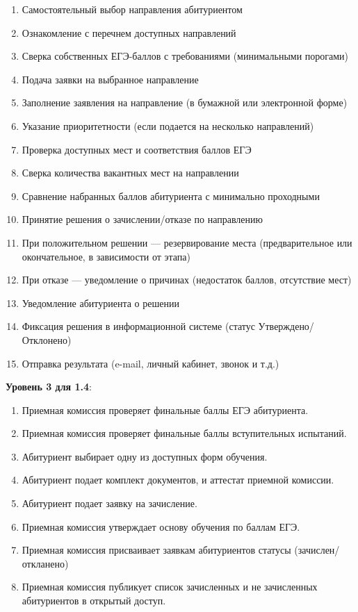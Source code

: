 \documentclass[areasetadvanced]{scrartcl}
\begin{document}
\begin{enumerate}
    \item Самостоятельный выбор направления абитуриентом
    \item Ознакомление с перечнем доступных направлений
    \item Сверка собственных ЕГЭ-баллов с требованиями (минимальными порогами)
    \item Подача заявки на выбранное направление
    \item Заполнение заявления на направление (в бумажной или электронной форме)
    \item Указание приоритетности (если подается на несколько направлений)
    \item Проверка доступных мест и соответствия баллов ЕГЭ
    \item Сверка количества вакантных мест на направлении
    \item Сравнение набранных баллов абитуриента с минимально проходными
    \item Принятие решения о зачислении/отказе по направлению
    \item При положительном решении — резервирование места (предварительное или окончательное, в зависимости от этапа)
    \item При отказе — уведомление о причинах (недостаток баллов, отсутствие мест)
    \item Уведомление абитуриента о решении
    \item Фиксация решения в информационной системе (статус Утверждено/ Отклонено)
    \item Отправка результата (e-mail, личный кабинет, звонок и т.д.)
    
\end{enumerate}
\textbf{Уровень 3 для 1.4}:
\begin{enumerate}
    \item Приемная комиссия проверяет финальные баллы ЕГЭ абитуриента.
    \item Приемная комиссия проверяет финальные баллы вступительных испытаний.
    \item Абитуриент выбирает одну из доступных форм обучения.
    \item Абитуриент подает комплект документов, и аттестат приемной комиссии.
    \item Абитуриент подает заявку на зачисление.
    \item Приемная комиссия утверждает основу обучения по баллам ЕГЭ.
    \item Приемная комиссия присваивает заявкам абитуриентов статусы (зачислен/ откланено)
    \item Приемная комиссия публикует список зачисленных и не зачисленных абитуриентов в открытый доступ.
\end{enumerate}
\end{document}
